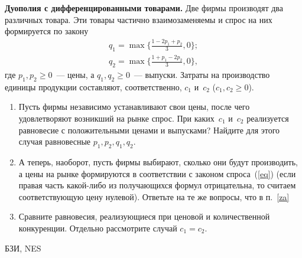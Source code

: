 \begin{problem}
 {\bf Дуополия с дифференцированными товарами.} Две
фирмы производят два различных товара. Эти товары частично
взаимозаменяемы и спрос на них формируется по закону
\begin{equation}\label{eq}
\begin{array}{l}
  q_1=\max\biggl\{\frac{1-2p_1+p_2}{3},0\biggr\};\\
  q_2=\max\biggl\{\frac{1+p_1-2p_2}{3},0\biggr\},
\end{array}\end{equation}
где $p_1,p_2\ge 0$~--- цены, а $q_1,q_2\ge 0$~--- выпуски.
Затраты на производство единицы продукции составляют,
соответственно, $c_1$ и~$c_2$ ($c_1,c_2\ge 0$).
\begin{enumerate}
  \item\label{za} Пусть фирмы независимо устанавливают свои цены,
  после чего удовлетворяют возникший на рынке спрос. При каких~$c_1$
  и~$c_2$ реализуется равновесие с положительными ценами и
  выпусками? Найдите для этого случая равновесные $p_1,p_2,q_1,q_2$.
  \item А теперь, наоборот, пусть фирмы выбирают, сколько они
  будут производить, а цены на рынке формируются в соответствии с
  законом спроса~(\ref{eq}) (если правая часть какой-либо из получающихся
  формул отрицательна, то считаем соответствующую цену нулевой).
  Ответьте на те же вопросы, что в п.~\ref{za}
  \item Сравните равновесия, реализующиеся при ценовой и количественной
  конкуренции. Отдельно рассмотрите случай $c_1=c_2$.
\end{enumerate}




\begin{source}
БЗИ, NES
\end{source}


\begin{sol}

\end{sol}
\end{problem}




